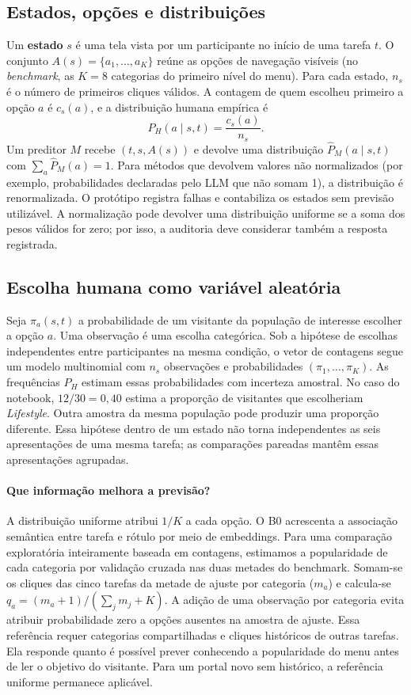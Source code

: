 \documentclass[12pt]{article}
\newcommand{\Ph}{P_H}
\newcommand{\Pp}{\hat{P}}
\begin{document}
\subsection{Estados, opções e distribuições}

Um \textbf{estado} $s$ é uma tela vista por um participante no início de uma tarefa $t$. O conjunto $A(s)=\{a_1,\dots,a_K\}$ reúne as opções de navegação visíveis (no \textit{benchmark}, as $K=8$ categorias do primeiro nível do menu). Para cada estado, $n_s$ é o número de primeiros cliques válidos. A contagem de quem escolheu primeiro a opção $a$ é $c_s(a)$, e a distribuição humana empírica é
\begin{equation}
\Ph(a \mid s,t) = \frac{c_s(a)}{n_s}.
\end{equation}
Um preditor $M$ recebe $(t, s, A(s))$ e devolve uma distribuição $\Pp_M(a \mid s,t)$ com $\sum_a \Pp_M(a)=1$. Para métodos que devolvem valores não normalizados (por exemplo, probabilidades declaradas pelo LLM que não somam 1), a distribuição é renormalizada. O protótipo registra falhas e contabiliza os estados sem previsão utilizável. A normalização pode devolver uma distribuição uniforme se a soma dos pesos válidos for zero; por isso, a auditoria deve considerar também a resposta registrada.

\subsection{Escolha humana como variável aleatória}
Seja $\pi_a(s,t)$ a probabilidade de um visitante da população de interesse escolher a opção $a$. Uma observação é uma escolha categórica. Sob a hipótese de escolhas independentes entre participantes na mesma condição, o vetor de contagens segue um modelo multinomial com $n_s$ observações e probabilidades $(\pi_1,\ldots,\pi_K)$. As frequências $\Ph$ estimam essas probabilidades com incerteza amostral. No caso do notebook, $12/30=0{,}40$ estima a proporção de visitantes que escolheriam \emph{Lifestyle}. Outra amostra da mesma população pode produzir uma proporção diferente. Essa hipótese dentro de um estado não torna independentes as seis apresentações de uma mesma tarefa; as comparações pareadas mantêm essas apresentações agrupadas.

\paragraph{Que informação melhora a previsão?} A distribuição uniforme atribui $1/K$ a cada opção. O B0 acrescenta a associação semântica entre tarefa e rótulo por meio de embeddings. Para uma comparação exploratória inteiramente baseada em contagens, estimamos a popularidade de cada categoria por validação cruzada nas duas metades do benchmark. Somam-se os cliques das cinco tarefas da metade de ajuste por categoria ($m_a$) e calcula-se $q_a=(m_a+1)/(\sum_j m_j+K)$. A adição de uma observação por categoria evita atribuir probabilidade zero a opções ausentes na amostra de ajuste. Essa referência requer categorias compartilhadas e cliques históricos de outras tarefas. Ela responde quanto é possível prever conhecendo a popularidade do menu antes de ler o objetivo do visitante. Para um portal novo sem histórico, a referência uniforme permanece aplicável.
\end{document}

